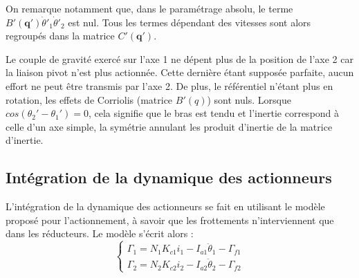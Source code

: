\documentclass[10pt,a4paper,twocolumn]{article}
\begin{document}
On remarque notamment que, dans le paramétrage absolu, 
le terme $B'(\mathbf{q}')\dot{\theta}'_1\dot{\theta}'_2$ est nul. 
Tous les termes dépendant des vitesses sont alors regroupés dans la matrice $C'(\mathbf{q}')$.

Le couple de gravité exercé sur l'axe 1 ne dépent plus de la position de l'axe 2 car la 
liaison pivot n'est plus actionnée. Cette dernière étant supposée parfaite, aucun effort
ne peut être transmis par l'axe 2. De plus, le référentiel n'étant plus en rotation, 
les effets de Corriolis (matrice $B'(q)$) sont nuls. Lorsque $cos(\theta_2' - \theta_1') = 0$, 
cela signifie que le bras est tendu et l'inertie correspond à celle d'un axe simple, 
la symétrie annulant les produit d'inertie de la matrice d'inertie.

\subsection{Intégration de la dynamique des actionneurs}
L'intégration de la dynamique des actionneurs se fait en utilisant le modèle proposé 
pour l'actionnement, à savoir que les frottements n'interviennent que dans les réducteurs. 
Le modèle s'écrit alors :
\begin{equation}
\begin{cases}
  \Gamma_1 = N_1 K_{c1} i_1 - I_{a1}\ddot{\theta}_1 - \Gamma_{f1} \\
  \Gamma_2 = N_2 K_{c2} i_2 - I_{a2}\ddot{\theta}_2 - \Gamma_{f2}
\end{cases}
\label{eq:modele_actionneurs}
\end{equation}
\end{document}
